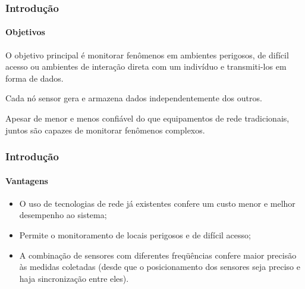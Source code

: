 \documentclass[notes]{beamer}
\begin{document}
\begin{frame}
\frametitle{Introdução}
\framesubtitle{Objetivos}

\begin{block}

O objetivo principal é monitorar fenômenos em ambientes perigosos, de difícil acesso ou ambientes de interação direta com um indivíduo e transmiti-los em forma de dados. 
\end{block} \pause

\begin{block}

Cada nó sensor gera e armazena dados independentemente dos outros.

\end{block} \pause

\begin{block}

Apesar de menor e menos confiável do que equipamentos de rede tradicionais, juntos são capazes de monitorar fenômenos complexos. 

\end{block}

\end{frame}

\begin{frame}
\frametitle{Introdução}
\framesubtitle{Vantagens}

\begin{block}

\begin{itemize}

\item O uso de tecnologias de rede já existentes confere um custo menor e melhor desempenho ao sistema; \pause

\item Permite o monitoramento de locais perigosos e de difícil acesso; \pause

\item A combinação de sensores com diferentes freqüências confere maior precisão às medidas coletadas (desde que o posicionamento dos sensores seja preciso e haja sincronização entre eles). 

\end{itemize}

\end{block}

\end{frame}
\end{document}
